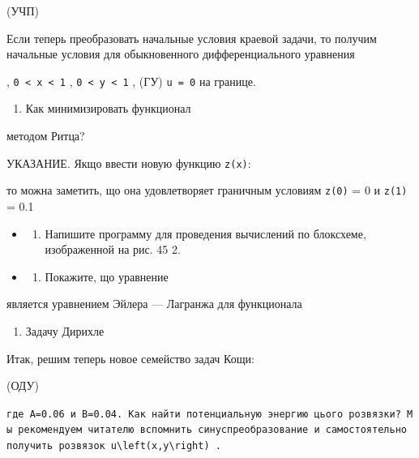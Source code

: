\documentclass[
  ukrainian,
]{article}
\providecommand{\tightlist}{%
  \setlength{\itemsep}{0pt}\setlength{\parskip}{0pt}}
\begin{document}
(УЧП)

Если теперь преобразовать начальные условия краевой задачи, то получим
начальные условия для обыкновенного дифференциального уравнения

, \texttt{0\ \textless{}\ x\ \textless{}\ 1} ,
\texttt{0\ \textless{}\ y\ \textless{}\ 1} , (ГУ) \texttt{u\ =\ 0} на
границе.

\begin{enumerate}
\def\labelenumi{\arabic{enumi}.}
\setcounter{enumi}{1}
\tightlist
\item
  Как минимизировать функционал
\end{enumerate}

методом Ритца?

УКАЗАНИЕ. Якщо ввести новую функцию \texttt{z(x)}:

то можна заметить, що она удовлетворяет граничным условиям \texttt{z(0)}
= 0 и \texttt{z(1)} = 0.1

\begin{itemize}
\tightlist
\item
  \begin{enumerate}
  \def\labelenumi{\arabic{enumi}.}
  \setcounter{enumi}{2}
  \tightlist
  \item
    Напишите программу для проведения вычислений по блоксхеме,
    изображенной на рис. 45 2.
  \end{enumerate}
\item
  \begin{enumerate}
  \def\labelenumi{\arabic{enumi}.}
  \setcounter{enumi}{3}
  \tightlist
  \item
    Покажите, що уравнение
  \end{enumerate}
\end{itemize}

является уравнением Эйлера --- Лагранжа для функционала

\begin{enumerate}
\def\labelenumi{\arabic{enumi}.}
\setcounter{enumi}{4}
\tightlist
\item
  Задачу Дирихле
\end{enumerate}

Итак, решим теперь новое семейство задач Кощи:

(ОДУ)

\texttt{где\ A=0.06\ и\ B=0.04.\ Как\ найти\ потенциальную\ энергию\ цього\ розв\textquotesingle{}язки?\ Мы\ рекомендуем\ читателю\ вспомнить\ синуспреобразование\ и\ самостоятельно\ получить\ розв\textquotesingle{}язок\ \textquotesingle{}u\textbackslash{}left(x,y\textbackslash{}right)\textquotesingle{}\ .}
\end{document}
